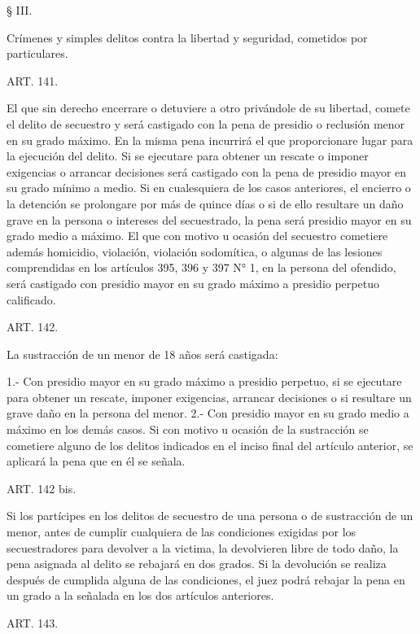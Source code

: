     § III.

    Crímenes y simples delitos contra la libertad y seguridad, cometidos por particulares.





    ART. 141.

    El que sin derecho encerrare o detuviere a otro privándole de su libertad, comete el delito de secuestro y será castigado con la pena de presidio o reclusión menor en su grado máximo.
    En la misma pena incurrirá el que proporcionare lugar para la ejecución del delito.
    Si se ejecutare para obtener un rescate o imponer exigencias o arrancar decisiones será castigado con la pena de presidio mayor en su grado mínimo a medio.
    Si en cualesquiera de los casos anteriores, el encierro o la detención se prolongare por más de quince días o si de ello resultare un daño grave en la persona o intereses del secuestrado, la pena será presidio mayor en su grado medio a máximo.
    El que con motivo u ocasión del secuestro cometiere además homicidio, violación, violación sodomítica, o algunas de las lesiones comprendidas en los artículos 395, 396 y 397 N° 1, en la persona del ofendido, será castigado con presidio mayor en su grado máximo a presidio perpetuo calificado.



    ART. 142.

    La sustracción de un menor de 18 años será castigada:

    1.- Con presidio mayor en su grado máximo a presidio perpetuo, si se ejecutare para obtener un rescate, imponer exigencias, arrancar decisiones o si resultare un grave daño en la persona del menor.
    2.- Con presidio mayor en su grado medio a máximo en los demás casos.
    Si con motivo u ocasión de la sustracción se cometiere alguno de los delitos indicados en el inciso final del artículo anterior, se aplicará la pena que en él se señala.


    ART. 142 bis.

    Si los partícipes en los delitos de secuestro de una persona o de sustracción de un menor, antes de cumplir cualquiera de las condiciones exigidas por los secuestradores para devolver a la victima, la devolvieren libre de todo daño, la pena asignada al delito se rebajará en dos grados. Si la devolución se realiza después de cumplida alguna de las condiciones, el juez podrá rebajar la pena en un grado a la señalada en los dos artículos anteriores.


    ART. 143.

